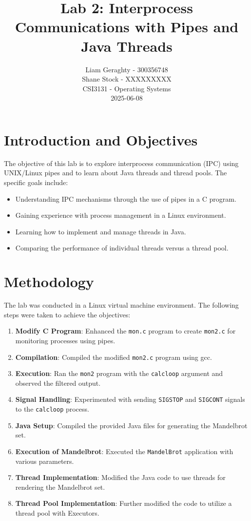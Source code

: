 \documentclass[a4paper,12pt]{article}
\title{Lab 2: Interprocess Communications with Pipes and Java Threads}
\author{Liam Geraghty - 300356748 \\ Shane Stock - XXXXXXXXX \\ CSI3131 - Operating Systems \\ 2025-06-08}
\date{}
\begin{document}
\maketitle

\section{Introduction and Objectives}
The objective of this lab is to explore interprocess communication (IPC) using UNIX/Linux pipes and to learn about Java threads and thread pools. The specific goals include:
\begin{itemize}
    \item Understanding IPC mechanisms through the use of pipes in a C program.
    \item Gaining experience with process management in a Linux environment.
    \item Learning how to implement and manage threads in Java.
    \item Comparing the performance of individual threads versus a thread pool.
\end{itemize}

\section{Methodology}
The lab was conducted in a Linux virtual machine environment. The following steps were taken to achieve the objectives:
\begin{enumerate}
    \item \textbf{Modify C Program}: Enhanced the \texttt{mon.c} program to create \texttt{mon2.c} for monitoring processes using pipes.
    \item \textbf{Compilation}: Compiled the modified \texttt{mon2.c} program using gcc.
    \item \textbf{Execution}: Ran the \texttt{mon2} program with the \texttt{calcloop} argument and observed the filtered output.
    \item \textbf{Signal Handling}: Experimented with sending \texttt{SIGSTOP} and \texttt{SIGCONT} signals to the \texttt{calcloop} process.
    \item \textbf{Java Setup}: Compiled the provided Java files for generating the Mandelbrot set.
    \item \textbf{Execution of Mandelbrot}: Executed the \texttt{MandelBrot} application with various parameters.
    \item \textbf{Thread Implementation}: Modified the Java code to use threads for rendering the Mandelbrot set.
    \item \textbf{Thread Pool Implementation}: Further modified the code to utilize a thread pool with Executors.
\end{enumerate}
\end{document}
